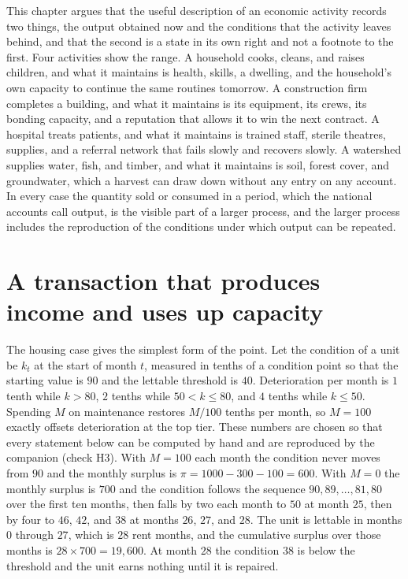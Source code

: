 This chapter argues that the useful description of an economic activity records two things, the output obtained now and the conditions that the activity leaves behind, and that the second is a state in its own right and not a footnote to the first. Four activities show the range. A household cooks, cleans, and raises children, and what it maintains is health, skills, a dwelling, and the household's own capacity to continue the same routines tomorrow. A construction firm completes a building, and what it maintains is its equipment, its crews, its bonding capacity, and a reputation that allows it to win the next contract. A hospital treats patients, and what it maintains is trained staff, sterile theatres, supplies, and a referral network that fails slowly and recovers slowly. A watershed supplies water, fish, and timber, and what it maintains is soil, forest cover, and groundwater, which a harvest can draw down without any entry on any account. In every case the quantity sold or consumed in a period, which the national accounts call output, is the visible part of a larger process, and the larger process includes the reproduction of the conditions under which output can be repeated.

\section{A transaction that produces income and uses up capacity}

The housing case gives the simplest form of the point. Let the condition of a unit be $k_t$ at the start of month $t$, measured in tenths of a condition point so that the starting value is $90$ and the lettable threshold is $40$. Deterioration per month is $1$ tenth while $k>80$, $2$ tenths while $50<k\le 80$, and $4$ tenths while $k\le 50$. Spending $M$ on maintenance restores $M/100$ tenths per month, so $M=100$ exactly offsets deterioration at the top tier. These numbers are chosen so that every statement below can be computed by hand and are reproduced by the companion (check H3). With $M=100$ each month the condition never moves from $90$ and the monthly surplus is $\pi=1000-300-100=600$. With $M=0$ the monthly surplus is $700$ and the condition follows the sequence $90,89,\dots,81,80$ over the first ten months, then falls by two each month to $50$ at month $25$, then by four to $46$, $42$, and $38$ at months $26$, $27$, and $28$. The unit is lettable in months $0$ through $27$, which is $28$ rent months, and the cumulative surplus over those months is $28\times 700=19{,}600$. At month $28$ the condition $38$ is below the threshold and the unit earns nothing until it is repaired.

